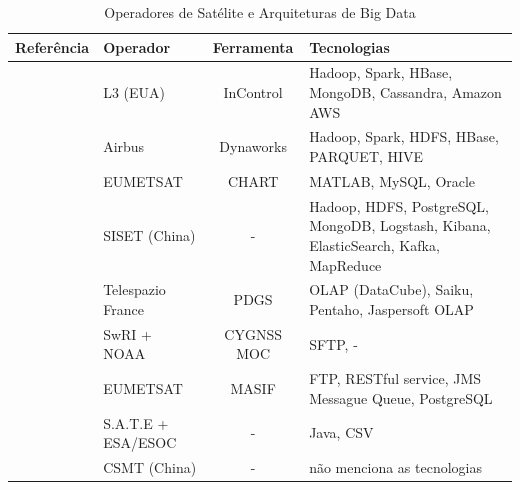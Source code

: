 \begin{table}[htbp]
  \begin{center}
    \caption{Operadores de Satélite e Arquiteturas de Big Data}\label{table:bigdataoperators}
    \begin{tabular}{|C{8em}|C{6em}|c|C{10em}|}
      \hline
      \bfseries Referência                           & \bfseries Operador & \bfseries Ferramenta & \bfseries Tecnologias                                                                \\
      \hline
      \cite{adamskiDataAnalyticsLarge2016}           & L3 (EUA)           & InControl            & Hadoop, Spark, HBase, MongoDB, Cassandra, Amazon AWS                                 \\
      \hline
      \cite{boussoufBigDataBased2018}                & Airbus             & Dynaworks            & Hadoop, Spark, HDFS, HBase, PARQUET, HIVE                                            \\
      \hline
      \cite{schulsterCHARTingFutureOffline2018}      & EUMETSAT           & CHART                & MATLAB, MySQL, Oracle                                                                \\
      \hline
      \cite{zhangBigDataFramework2017}               & SISET (China)      & -                    & Hadoop, HDFS, PostgreSQL, MongoDB, Logstash, Kibana, ElasticSearch, Kafka, MapReduce \\
      \hline
      \cite{yvernesCopernicusGroundSegment2018}      & Telespazio France  & PDGS                 & OLAP (DataCube), Saiku, Pentaho, Jaspersoft OLAP                                     \\
      \hline
      \cite{dischnerCYGNSSMOCMeeting2016}            & SwRI + NOAA        & CYGNSS MOC           & SFTP, -                                                                              \\
      \hline
      \cite{edwardsDealingBigData2018}               & EUMETSAT           & MASIF                & FTP, RESTful service, JMS Messague Queue, PostgreSQL                                 \\
      \hline
      \cite{evansDataMiningDrastically2016}          & S.A.T.E + ESA/ESOC & -                    & Java, CSV                                                                            \\
      \hline
      \cite{fenManagementOperationCommunication2016} & CSMT (China)       & -                    & não menciona as tecnologias                                                          \\

\end{tabular}
\end{center}
\end{table}
